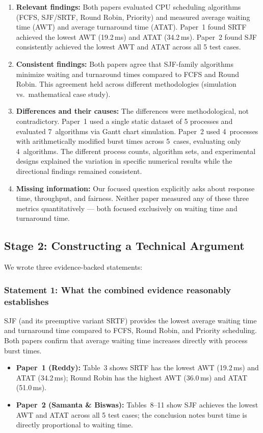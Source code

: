 \documentclass[11pt, a4paper]{article}
\begin{document}
\begin{enumerate}[nosep]
    \item \textbf{Relevant findings:} Both papers evaluated CPU scheduling algorithms (FCFS, SJF/SRTF, Round Robin, Priority) and measured average waiting time (AWT) and average turnaround time (ATAT). Paper~1 found SRTF achieved the lowest AWT (19.2\,ms) and ATAT (34.2\,ms). Paper~2 found SJF consistently achieved the lowest AWT and ATAT across all 5 test cases.

    \item \textbf{Consistent findings:} Both papers agree that SJF-family algorithms minimize waiting and turnaround times compared to FCFS and Round Robin. This agreement held across different methodologies (simulation vs.\ mathematical case study).

    \item \textbf{Differences and their causes:} The differences were methodological, not contradictory. Paper~1 used a single static dataset of 5 processes and evaluated 7~algorithms via Gantt chart simulation. Paper~2 used 4~processes with arithmetically modified burst times across 5~cases, evaluating only 4~algorithms. The different process counts, algorithm sets, and experimental designs explained the variation in specific numerical results while the directional findings remained consistent.

    \item \textbf{Missing information:} Our focused question explicitly asks about response time, throughput, and fairness. Neither paper measured any of these three metrics quantitatively --- both focused exclusively on waiting time and turnaround time.
\end{enumerate}

\subsection{Stage 2: Constructing a Technical Argument}
We wrote three evidence-backed statements:

\subsubsection*{Statement 1: What the combined evidence reasonably establishes}
SJF (and its preemptive variant SRTF) provides the lowest average waiting time and turnaround time compared to FCFS, Round Robin, and Priority scheduling. Both papers confirm that average waiting time increases directly with process burst times.
\begin{itemize}[nosep]
    \item \textbf{Paper~1 (Reddy):} Table~3 shows SRTF has the lowest AWT (19.2\,ms) and ATAT (34.2\,ms); Round Robin has the highest AWT (36.0\,ms) and ATAT (51.0\,ms).
    \item \textbf{Paper~2 (Samanta \& Biswas):} Tables~8--11 show SJF achieves the lowest AWT and ATAT across all 5 test cases; the conclusion notes burst time is directly proportional to waiting time.
\end{itemize}
\end{document}
